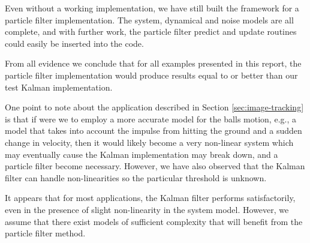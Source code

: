 Even without a working implementation, we have still built the framework for a
particle filter implementation. The system, dynamical and noise models are
all complete, and with further work, the particle filter predict and update
routines could easily be inserted into the code.

From all evidence we conclude that for all examples presented in this report, 
the particle filter implementation would produce results equal to or better than
our test Kalman implementation.

One point to note about the application described in Section \ref{sec:image-tracking}
is that if were we to employ a more accurate model for the balls motion, e.g., 
a model that takes into account the impulse from hitting the ground and a sudden change in velocity,
then it would likely become a very non-linear system which may eventually 
cause the Kalman implementation may break down, and a particle filter become necessary.
However, we have also observed that the Kalman filter can handle non-linearities so 
the particular threshold is unknown.

It appears that for most applications, the Kalman filter performs 
satisfactorily, even in the presence of slight non-linearity in the
system model. However, we assume that there exist models of sufficient complexity
that will benefit from the particle filter method.

